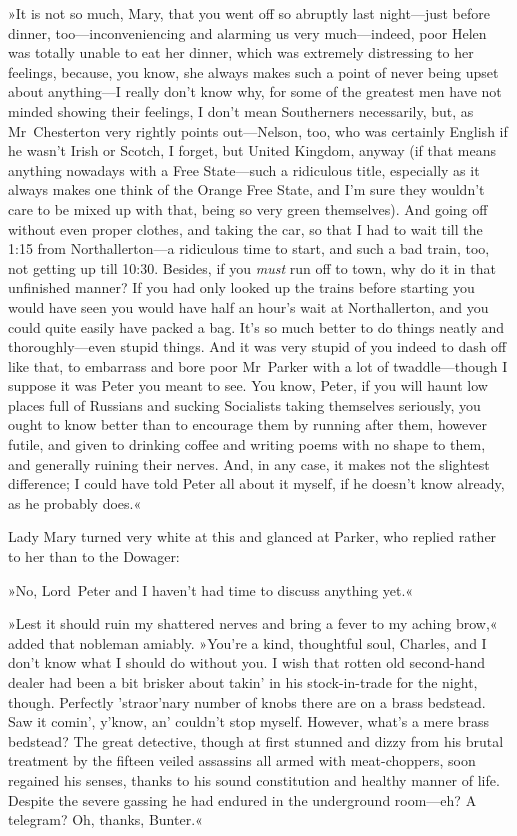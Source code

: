 »It is not so much, Mary, that you went off so abruptly last night—just before dinner, too—inconveniencing and alarming us very much—indeed, poor Helen was totally unable to eat her dinner, which was extremely distressing to her feelings, because, you know, she always makes such a point of never being upset about anything—I really don't know why, for some of the greatest men have not minded showing their feelings, I don't mean Southerners necessarily, but, as Mr~Chesterton very rightly points out—Nelson, too, who was certainly English if he wasn't Irish or Scotch, I forget, but United Kingdom, anyway (if that means anything nowadays with a Free State—such a ridiculous title, especially as it always makes one think of the Orange Free State, and I'm sure they wouldn't care to be mixed up with that, being so very green themselves). And going off without even proper clothes, and taking the car, so that I had to wait till the 1:15 from Northallerton—a ridiculous time to start, and such a bad train, too, not getting up till 10:30. Besides, if you \textit{must} run off to town, why do it in that unfinished manner? If you had only looked up the trains before starting you would have seen you would have half an hour's wait at Northallerton, and you could quite easily have packed a bag.  It's so much better to do things neatly and thoroughly—even stupid things. And it was very stupid of you indeed to dash off like that, to embarrass and bore poor Mr~Parker with a lot of twaddle—though I suppose it was Peter you meant to see. You know, Peter, if you will haunt low places full of Russians and sucking Socialists taking themselves seriously, you ought to know better than to encourage them by running after them, however futile, and given to drinking coffee and writing poems with no shape to them, and generally ruining their nerves. And, in any case, it makes not the slightest difference; I could have told Peter all about it myself, if he doesn't know already, as he probably does.«

Lady Mary turned very white at this and glanced at Parker, who replied rather to her than to the Dowager:

»No, Lord~Peter and I haven't had time to discuss anything yet.«

»Lest it should ruin my shattered nerves and bring a fever to my aching brow,« added that nobleman amiably. »You're a kind, thoughtful soul, Charles, and I don't know what I should do without you. I wish that rotten old second-hand dealer had been a bit brisker about takin' in his stock-in-trade for the night, though. Perfectly 'straor'nary number of knobs there are on a brass bedstead. Saw it comin', y'know, an' couldn't stop myself. However, what's a mere brass bedstead? The great detective, though at first stunned and dizzy from his brutal treatment by the fifteen veiled assassins all armed with meat-choppers, soon regained his senses, thanks to his sound constitution and healthy manner of life. Despite the severe gassing he had endured in the underground room—eh? A telegram? Oh, thanks, Bunter.«

